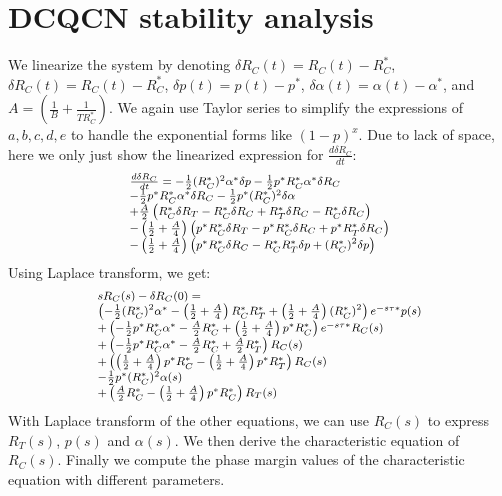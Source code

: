 \appendix
\section{DCQCN stability analysis}
\label{sec:dcqcn_stability_analysis}

We linearize the system by denoting $\delta {R_C}(t) = {R_C}(t) - R_C^*$,
$\delta {R_C}(t) = {R_C}(t) - R_C^*$, $\delta p(t) = p(t) - p^*$, $\delta \alpha
(t) = \alpha (t) - \alpha^*$, and $A = \left( {\frac{1}{B} + \frac{1}{{TR_C^*}}}
\right)$.  We again use Taylor series to simplify the expressions of $a, b, c,
d, e$ to handle the exponential forms like $(1-p)^x$.  Due to lack of space,
here we only just show the linearized expression for $\frac{{d\delta {R_C}}}{{dt}}$:
\begin{equation}
\small
\begin{array}{l}
\frac{{d\delta {R_C}}}{{dt}} =  - \frac{1}{2}{(R_C^*)^2}{\alpha ^*}\delta p - \frac{1}{2}{p^*}R_C^*{\alpha ^*}\delta R_C \\
 - \frac{1}{2}{p^*}R_C^*{\alpha ^*}\delta {R_C} - \frac{1}{2}{p^*}{(R_C^*)^2}\delta \alpha \\
 + \frac{A}{2}\left( {R_C^*\delta {R_T} - R_C^*\delta {R_C} + R_T^*\delta {R_C} - R_C^*\delta R_C} \right)\\
 - \left( {\frac{1}{2} + \frac{A}{4}} \right)\left( {{p^*}R_C^*\delta {R_T} - {p^*}R_C^*\delta {R_C} + {p^*}R_T^*\delta {R_C}} \right)\\ 
 - \left( {\frac{1}{2} + \frac{A}{4}} \right)\left( {{p^*}R_C^*\delta R_C - R_C^*R_T^*\delta p + {{(R_C^*)}^2}\delta p} \right)
\end{array}
\end{equation}
Using Laplace transform, we get:
\begin{equation}
\small
\begin{array}{l}
s{R_C}(s) - \delta {R_C}(0) = \\
\left( { - \frac{1}{2}{{(R_C^*)}^2}{\alpha ^*} - \left( {\frac{1}{2} + \frac{A}{4}} \right)R_C^*R_T^* + \left( {\frac{1}{2} + \frac{A}{4}} \right){{(R_C^*)}^2}} \right){e^{ - s\tau *}}p(s)\\
 + \left( { - \frac{1}{2}{p^*}R_C^*{\alpha ^*} - \frac{A}{2}R_C^* + \left( {\frac{1}{2} + \frac{A}{4}} \right){p^*}R_C^*} \right){e^{ - s\tau *}}{R_C}(s)\\
 + \left( { - \frac{1}{2}{p^*}R_C^*{\alpha ^*} - \frac{A}{2}R_C^* + \frac{A}{2}R_T^* }\right){R_C}(s)\\
 + \left( { \left( {\frac{1}{2} + \frac{A}{4}} \right){p^*}R_C^* - \left( {\frac{1}{2} + \frac{A}{4}} \right){p^*}R_T^*} \right){R_C}(s)\\
 - \frac{1}{2}{p^*}{(R_C^*)^2}\alpha (s)\\
 + \left( {\frac{A}{2}R_C^* - \left( {\frac{1}{2} + \frac{A}{4}} \right){p^*}R_C^*} \right){R_T}(s)
\end{array}
\end{equation}
With Laplace transform of the other equations, we can use ${R_C}(s)$ to express
${R_T}(s)$, $p(s)$ and $\alpha (s)$.  We then derive the characteristic equation
of ${R_C}(s)$. Finally we compute the phase margin values of the characteristic equation
with different parameters.


